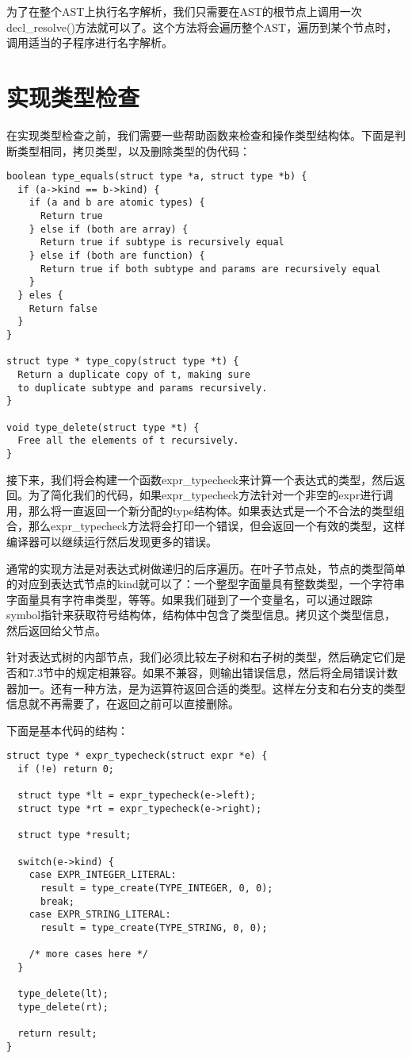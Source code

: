 \documentclass[cn,11pt,chinese]{elegantbook}
\begin{document}
为了在整个AST上执行名字解析，我们只需要在AST的根节点上调用一次decl\_resolve()方法就可以了。这个方法将会遍历整个AST，遍历到某个节点时，调用适当的子程序进行名字解析。

\section{实现类型检查}

在实现类型检查之前，我们需要一些帮助函数来检查和操作类型结构体。下面是判断类型相同，拷贝类型，以及删除类型的伪代码：

\begin{verbatim}
boolean type_equals(struct type *a, struct type *b) {
  if (a->kind == b->kind) {
    if (a and b are atomic types) {
      Return true
    } else if (both are array) {
      Return true if subtype is recursively equal
    } else if (both are function) {
      Return true if both subtype and params are recursively equal
    }
  } eles {
    Return false
  }
}

struct type * type_copy(struct type *t) {
  Return a duplicate copy of t, making sure
  to duplicate subtype and params recursively.
}

void type_delete(struct type *t) {
  Free all the elements of t recursively.
}
\end{verbatim}

接下来，我们将会构建一个函数expr\_typecheck来计算一个表达式的类型，然后返回。为了简化我们的代码，如果expr\_typecheck方法针对一个非空的expr进行调用，那么将一直返回一个新分配的type结构体。如果表达式是一个不合法的类型组合，那么expr\_typecheck方法将会打印一个错误，但会返回一个有效的类型，这样编译器可以继续运行然后发现更多的错误。

通常的实现方法是对表达式树做递归的后序遍历。在叶子节点处，节点的类型简单的对应到表达式节点的kind就可以了：一个整型字面量具有整数类型，一个字符串字面量具有字符串类型，等等。如果我们碰到了一个变量名，可以通过跟踪symbol指针来获取符号结构体，结构体中包含了类型信息。拷贝这个类型信息，然后返回给父节点。

针对表达式树的内部节点，我们必须比较左子树和右子树的类型，然后确定它们是否和7.3节中的规定相兼容。如果不兼容，则输出错误信息，然后将全局错误计数器加一。还有一种方法，是为运算符返回合适的类型。这样左分支和右分支的类型信息就不再需要了，在返回之前可以直接删除。

下面是基本代码的结构：

\begin{verbatim}
struct type * expr_typecheck(struct expr *e) {
  if (!e) return 0;
    
  struct type *lt = expr_typecheck(e->left);
  struct type *rt = expr_typecheck(e->right);
    
  struct type *result;
  
  switch(e->kind) {
    case EXPR_INTEGER_LITERAL:
      result = type_create(TYPE_INTEGER, 0, 0);
      break;
    case EXPR_STRING_LITERAL:
      result = type_create(TYPE_STRING, 0, 0);
          
    /* more cases here */
  }
    
  type_delete(lt);
  type_delete(rt);
    
  return result;
}
\end{verbatim}
\end{document}
